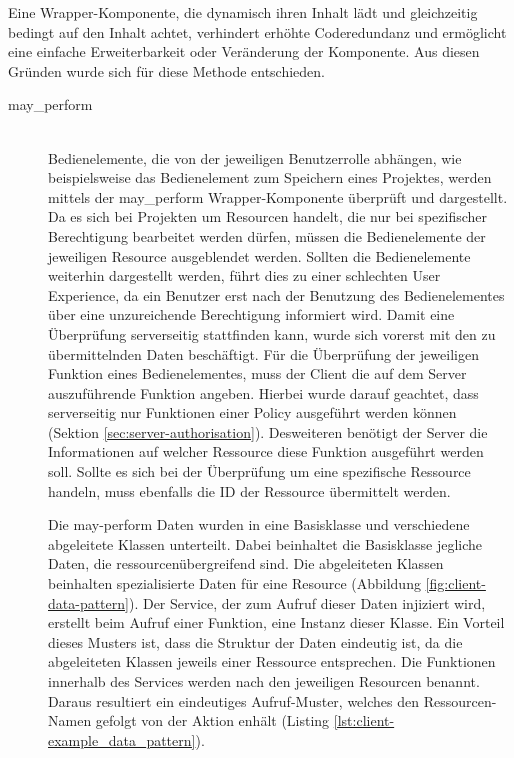 Eine Wrapper-Komponente, die dynamisch ihren Inhalt lädt und gleichzeitig bedingt auf den Inhalt achtet, verhindert erhöhte Coderedundanz und ermöglicht eine einfache Erweiterbarkeit oder Veränderung der Komponente. Aus diesen Gründen wurde sich für diese Methode entschieden.
\begin{description}
	\item[may\_perform]\hfill\\
	Bedienelemente, die von der jeweiligen Benutzerrolle abhängen, wie beispielsweise das Bedienelement zum Speichern eines Projektes, werden mittels der may\_perform Wrapper-Komponente überprüft und dargestellt. Da es sich bei Projekten um Resourcen handelt, die nur bei spezifischer Berechtigung bearbeitet werden dürfen, müssen die Bedienelemente der jeweiligen Resource ausgeblendet werden. Sollten die Bedienelemente weiterhin dargestellt werden, führt dies zu einer schlechten User Experience, da ein Benutzer erst nach der Benutzung des Bedienelementes über eine unzureichende Berechtigung informiert wird. Damit eine Überprüfung serverseitig stattfinden kann, wurde sich vorerst mit den zu übermittelnden Daten beschäftigt. Für die Überprüfung der jeweiligen Funktion eines Bedienelementes, muss der Client die auf dem Server auszuführende Funktion angeben. Hierbei wurde darauf geachtet, dass serverseitig nur Funktionen einer Policy ausgeführt werden können (Sektion \ref{sec:server-authorisation}). Desweiteren benötigt der Server die Informationen auf welcher Ressource diese Funktion ausgeführt werden soll. Sollte es sich bei der Überprüfung um eine spezifische Ressource handeln, muss ebenfalls die ID der Ressource übermittelt werden.

	\begin{minipage}{\linewidth}
		
	\end{minipage}

	Die may-perform Daten wurden in eine Basisklasse und verschiedene abgeleitete Klassen unterteilt. Dabei beinhaltet die Basisklasse jegliche Daten, die ressourcenübergreifend sind. Die abgeleiteten Klassen beinhalten spezialisierte Daten für eine Resource (Abbildung \ref{fig:client-data-pattern}). Der Service, der zum Aufruf dieser Daten injiziert wird, erstellt beim Aufruf einer Funktion, eine Instanz dieser Klasse. Ein Vorteil dieses Musters ist, dass die Struktur der Daten eindeutig ist, da die abgeleiteten Klassen jeweils einer Ressource entsprechen. Die Funktionen innerhalb des Services werden nach den jeweiligen Resourcen benannt. Daraus resultiert ein eindeutiges Aufruf-Muster, welches den Ressourcen-Namen gefolgt von der Aktion enhält (Listing \ref{lst:client-example_data_pattern}).


\end{description}
